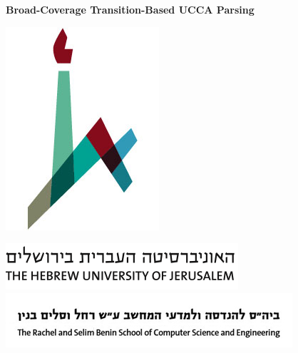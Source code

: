 \documentclass[a0,portrait]{a0poster}
\begin{document}

\begin{center}
	\veryHuge \color{NavyBlue} \textbf{Broad-Coverage Transition-Based UCCA Parsing}
\end{center}
\vspace{-1cm}
\begin{minipage}[b]{.07\linewidth}
\includegraphics[width=\linewidth]{huji_logo.jpg}
\vspace{5mm}
\end{minipage}
\begin{minipage}[b]{.16\linewidth}
\includegraphics[width=\linewidth]{huji_banner.png}
\includegraphics[width=\linewidth]{cse_banner.jpg}
\vspace{.8mm}
\end{minipage}
\end{document}
